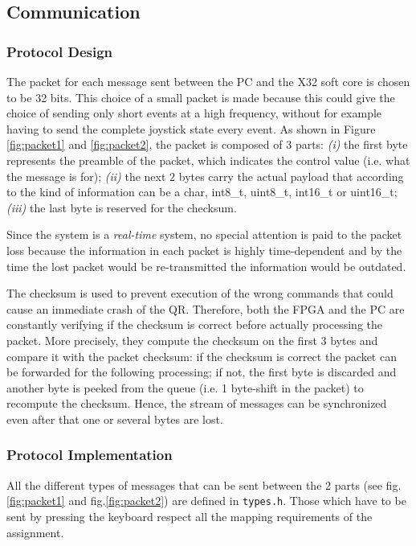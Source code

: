\documentclass[a4paper]{article}
\begin{document}
\subsection{Communication} %
\subsubsection{Protocol Design}
The packet for each message sent between the PC and the X32 soft core is chosen to be 32 bits. This choice of a small packet is made because this could give the choice of sending only short events at a high frequency, without for example having to send the complete joystick state every event. As shown in Figure \ref{fig:packet1} and \ref{fig:packet2}, the packet is composed of 3 parts: \textit{(i)} the first byte represents the preamble of the packet, which indicates the control value (i.e. what the message is for); \textit{(ii)} the next 2 bytes carry the actual payload that according to the kind of information can be a char, int8\_t, uint8\_t, int16\_t or uint16\_t; \textit{(iii)} the last byte is reserved for the checksum.

Since the system is a \emph{real-time} system, no special attention is paid to the packet loss because the information in each packet is highly time-dependent and by the time the lost packet would be re-transmitted the information would be outdated.

The checksum is used to prevent execution of the wrong commands that could cause an immediate crash of the QR. Therefore, both the FPGA and the PC are constantly verifying if the checksum is correct before actually processing the packet. More precisely, they compute the checksum on the first 3 bytes and compare it with the packet checksum: if the checksum is correct the packet can be forwarded for the following processing; if not, the first byte is discarded and another byte is peeked from the queue (i.e. 1 byte-shift in the packet) to recompute the checksum. Hence, the stream of messages can be synchronized even after that one or several bytes are lost. 

\subsubsection{Protocol Implementation}
All the different types of messages that can be sent between the 2 parts (see fig.\ref{fig:packet1} and fig.\ref{fig:packet2}) are defined in \texttt{types.h}. Those which have to be sent by pressing the keyboard respect all the mapping requirements of the assignment. 
\end{document}
